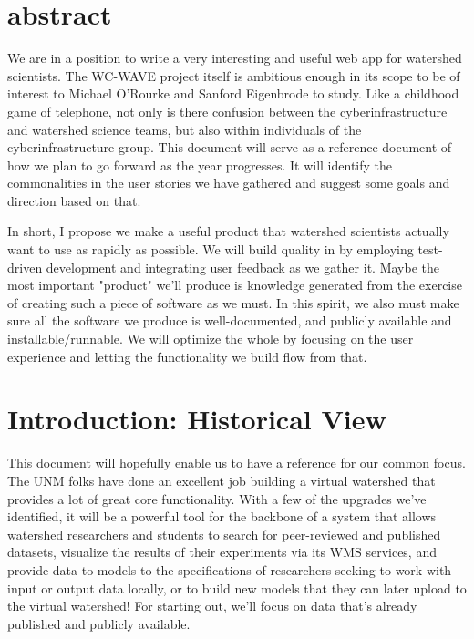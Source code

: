 \documentclass[
11pt, %
a4paper, %
oneside, %
twoside, %
headinclude,footinclude, %
BCOR5mm, %
]{scrartcl}
\title{\normalfont\spacedallcaps{Virtual Watershed Laboratory}} %
\subtitle{\normalfont\spacedallcaps{Plan for 2015: Optimize the Whole}} %
\author{\spacedlowsmallcaps{Matthew A. Turner*}} %
\begin{document}
\maketitle %

\setcounter{tocdepth}{2} %

\tableofcontents %
\section*{abstract}

We are in a position to write a very interesting and useful web app for watershed scientists.
The WC-WAVE project itself is ambitious enough in its scope to be of interest to 
Michael O'Rourke and Sanford Eigenbrode to study. Like a childhood game of telephone, not only
is there confusion between the cyberinfrastructure and watershed science teams, but also
within individuals of the cyberinfrastructure group. This document will serve as a reference
document of how we plan to go forward as the year progresses. It will identify the commonalities
in the user stories we have gathered and suggest some goals and direction based on that.

In short, I propose we make a useful product that watershed scientists actually want to use
as rapidly as possible. We will build quality in by employing test-driven development and 
integrating user feedback as we gather it. Maybe the most important "product" we'll produce
is knowledge generated from the exercise of creating such a piece of software as we must. In
this spirit, we also must make sure all the software we produce is well-documented, and publicly 
available and installable/runnable. We will optimize the whole by focusing on 
the user experience and letting the functionality we build flow from that.

{\let\thefootnote\relax{}}



\newpage
     

\section{Introduction: Historical View} %
\label{sec:intro}

This document will hopefully enable us to have a reference for our common focus. The UNM folks have
done an excellent job building a virtual watershed that provides a lot of great core functionality.
With a few of the upgrades we've identified, it will be a powerful tool for the backbone of a system
that allows watershed researchers and students to search for peer-reviewed and published datasets,
visualize the results of their experiments via its WMS services, and provide data to models to the
specifications of researchers seeking to work with input or output data locally, or to build new 
models that they can later upload to the virtual watershed! For starting out, we'll focus on 
data that's already published and publicly available. 
\end{document}
